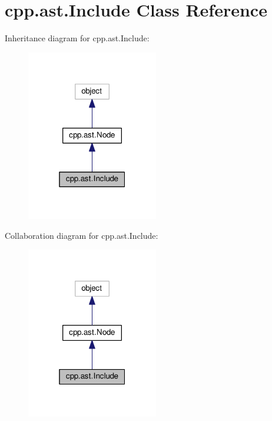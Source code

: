\hypertarget{classcpp_1_1ast_1_1Include}{}\section{cpp.\+ast.\+Include Class Reference}
\label{classcpp_1_1ast_1_1Include}


Inheritance diagram for cpp.\+ast.\+Include\+:\nopagebreak
\begin{figure}[H]
\begin{center}
\leavevmode
\includegraphics[width=163pt]{classcpp_1_1ast_1_1Include__inherit__graph}
\end{center}
\end{figure}


Collaboration diagram for cpp.\+ast.\+Include\+:\nopagebreak
\begin{figure}[H]
\begin{center}
\leavevmode
\includegraphics[width=163pt]{classcpp_1_1ast_1_1Include__coll__graph}
\end{center}
\end{figure}
